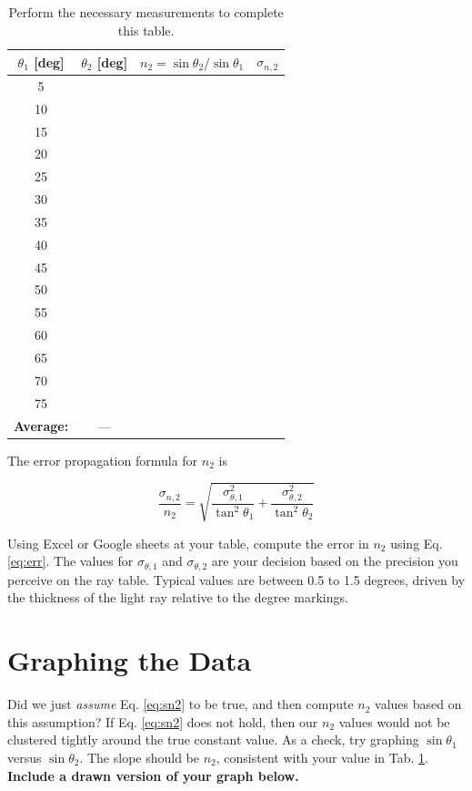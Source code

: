 \documentclass[12pt,twocolumn]{article}
\begin{document}
\begin{table}[ht]
\footnotesize
\centering
\begin{tabular}{| c | c | c | c |}
\hline
\textbf{$\theta_1$} [deg] & \textbf{$\theta_2$} [deg] & \textbf{$n_2 = \sin\theta_2/\sin\theta_1$} & \textbf{$\sigma_{n,2}$} \\ \hline
5 & & & \\ \hline
10 & & & \\ \hline
15 & & & \\ \hline
20 & & & \\ \hline
25 & & & \\ \hline
30 & & & \\ \hline
35 & & & \\ \hline
40 & & & \\ \hline
45 & & & \\ \hline
50 & & & \\ \hline
55 & & & \\ \hline
60 & & & \\ \hline
65 & & & \\ \hline
70 & & & \\ \hline
75 & & & \\ \hline \hline
\textbf{Average:} & --- & & \\ \hline
\end{tabular}
\caption{\label{tab:data} Perform the necessary measurements to complete this table.}
\end{table}

The error propagation formula for $n_2$ is

\begin{equation}
\frac{\sigma_{n,2}}{n_2} = \sqrt{\frac{\sigma_{\theta,1}^2}{\tan^2\theta_1} + \frac{\sigma_{\theta,2}^2}{\tan^2\theta_2}} \label{eq:err}
\end{equation}

Using Excel or Google sheets at your table, compute the error in $n_2$ using Eq. \ref{eq:err}.  The values for $\sigma_{\theta,1}$ and $\sigma_{\theta,2}$ are your decision based on the precision you perceive on the ray table.  Typical values are between 0.5 to 1.5 degrees, driven by the thickness of the light ray relative to the degree markings.

\section{Graphing the Data}

Did we just \textit{assume} Eq. \ref{eq:sn2} to be true, and then compute $n_2$ values based on this assumption?  If Eq. \ref{eq:sn2} does not hold, then our $n_2$ values would not be clustered tightly around the true constant value.  As a check, try graphing $\sin\theta_1$ versus $\sin\theta_2$.  The slope should be $n_2$, consistent with your value in Tab. \ref{tab:data}.  \textbf{Include a drawn version of your graph below.}
\end{document}
